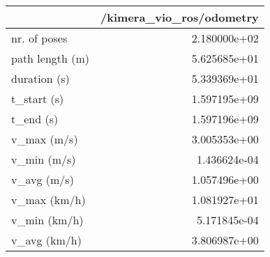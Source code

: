 \begin{tabular}{lr}
\toprule
{} &  /kimera\_vio\_ros/odometry \\
\midrule
nr. of poses    &              2.180000e+02 \\
path length (m) &              5.625685e+01 \\
duration (s)    &              5.339369e+01 \\
t\_start (s)     &              1.597195e+09 \\
t\_end (s)       &              1.597196e+09 \\
v\_max (m/s)     &              3.005353e+00 \\
v\_min (m/s)     &              1.436624e-04 \\
v\_avg (m/s)     &              1.057496e+00 \\
v\_max (km/h)    &              1.081927e+01 \\
v\_min (km/h)    &              5.171845e-04 \\
v\_avg (km/h)    &              3.806987e+00 \\
\bottomrule
\end{tabular}
